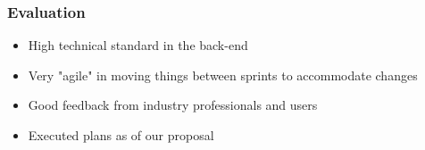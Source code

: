 \frametitle{Evaluation}

\begin{itemize}
	\item High technical standard in the back-end
	\item Very "agile" in moving things between sprints to accommodate changes
	\item Good feedback from industry professionals and users
	\item Executed plans as of our proposal
\end{itemize}